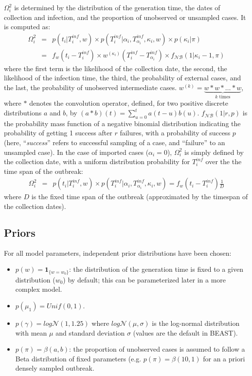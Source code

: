 \documentclass[10pt]{article}
\begin{document}
$\Omega_i^2$ is determined by the distribution of the generation time, the dates of collection and infection, and the proportion of unobserved or unsampled cases.
It is computed as:
\begin{eqnarray}
 \Omega_i^2 & = & p(t_i | T_i^{inf}, w) \times p(T_i^{inf}| \alpha_i, T_{\alpha_i}^{inf}, \kappa_i, w)  
    \times p(\kappa_i | \pi)\nonumber \\
& = &  f_w(t_i - T_i^{inf}) \times  w^{\left(\kappa_i\right)}(T_i^{inf} - T_{\alpha_i}^{inf}) \times f_{\mathcal{NB}}(1 |\kappa_i-1, \pi)
\end{eqnarray}
where the first term is the likelihood of the collection date, the second, the likelihood of the infection time, the third, the probability of external cases, and the last, the probability of unobserved intermediate cases.
$w^{\left(k\right)} = \underbrace{w*w*\ldots*w}_{k \text{ times}} $, where $*$ denotes the convolution operator, defined, for two positive discrete distributions $a$ and $b$, by $\left(a*b\right)\left(t\right) = \sum_{u=0}^{t} a\left(t-u\right)b\left(u\right)$. 
$f_{\mathcal{NB}}(1 | r, p)$ is the probability mass function of a negative binomial distribution indicating the probability of getting 1 success after $r$ failures, with a probability of success $p$ (here, ``\textit{success}'' refers to successful sampling of a case, and ``failure'' to an unsampled case).
In the case of imported cases ($\alpha_i=0$), $\Omega_i^2$ is simply defined by the collection date, with a uniform distribution probability for $T_i^{inf}$ over the the time span of the outbreak:
\begin{eqnarray}
\Omega_i^2 & = & p(t_i | T_i^{inf}, w) \times p(T_i^{inf}| \alpha_i, T_{\alpha_i}^{inf}, \kappa_i, w) 
  = f_w(t_i - T_i^{inf}) \frac{1}{D}
\end{eqnarray}
where $D$ is the fixed time span of the outbreak (approximated by the timespan of the collection dates).
\\



% 
\subsection*{Priors}

For all model parameters, independent prior distributions have been chosen:
\begin{itemize}
	\item $p(w) = \mathbf{1}_{\{w=w_0\}}$: the distribution of the generation time is fixed to a given distribution ($w_0$) by default; this can be parameterized later in a more complex model.
	\item $p(\mu_1) = Unif(0,1)$.
	\item $p(\gamma) = log\mathcal{N}(1,1.25)$ where $log\mathcal{N}(\mu,\sigma)$ is the log-normal distribution with mean $\mu$ and standard deviation $\sigma$ (values are the default in BEAST).
	\item $p(\pi) = \beta(a,b)$: the proportion of unobserved cases is assumed to follow a Beta distribution of fixed parameters (e.g. $p(\pi) = \beta(10,1)$ for an a priori densely sampled outbreak.
\end{itemize}
\end{document}
